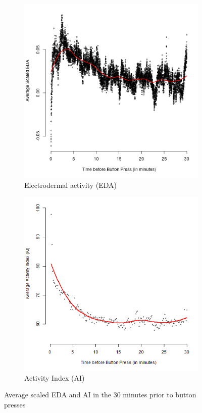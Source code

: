 \documentclass[12pt]{amsart}
\begin{document}
\begin{figure}[!th]
\centering
\begin{subfigure}{.5\textwidth}
  \centering
  \includegraphics[width=.8\linewidth]{../figures/smoothed_eda.png}
  \caption{Electrodermal activity (EDA)}
  \label{fig:mean_eda}
\end{subfigure}%
\begin{subfigure}{.5\textwidth}
  \centering
  \includegraphics[width=.8\linewidth]{../figures/smoothed_ai.png}
  \caption{Activity Index (AI)
}  \label{fig:mean_acc}
\end{subfigure}
\caption{Average scaled EDA and AI in the 30 minutes prior to button presses}
\label{fig:mean_edacc}
\end{figure}
\end{document}
